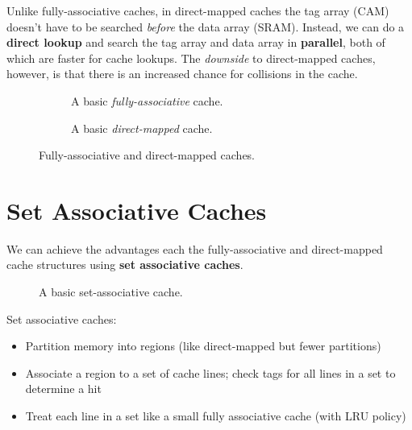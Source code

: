 
Unlike fully-associative caches, in direct-mapped caches the tag array (CAM) doesn't have to be searched \emph{before} the data array (SRAM). Instead, we can do a \textbf{direct lookup} and search the tag array and data array in \textbf{parallel}, both of which are faster for cache lookups. The \emph{downside} to direct-mapped caches, however, is that there is an increased chance for collisions in the cache.

\begin{figure}[H]
  \centering
  \begin{subfigure}[b]{0.45\textwidth}
    \centering
    \scriptsize
    \caption{A basic \emph{fully-associative} cache.}
    \label{fig:fullyassociative}
  \end{subfigure}
  \hfill
  \begin{subfigure}[b]{0.45\textwidth}
    \centering
    \scriptsize
    \caption{A basic \emph{direct-mapped} cache.}
    \label{fig:directmapped}
  \end{subfigure}
  \caption{Fully-associative and direct-mapped caches.}
\end{figure}

\section{Set Associative Caches}
We can achieve the advantages each the fully-associative and direct-mapped cache structures using \textbf{set associative caches}.

\begin{figure}[H]
  \centering
  \caption{A basic set-associative cache.}
  \label{fig:setassociative}
\end{figure}

\begin{definition}
  Set associative caches:
  \begin{itemize}
    \item Partition memory into regions (like direct-mapped but fewer partitions)
    \item Associate a region to a set of cache lines; check tags for all lines in a set to determine a hit
    \item Treat each line in a set like a small fully associative cache (with LRU policy)
  \end{itemize}
\end{definition}

